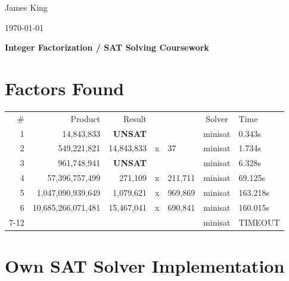 \documentclass[a4paper,12pt]{article}
\begin{document}
\begin{center}
\begin{minipage}{0.48\textwidth}
\begin{flushleft}
\small{James King}
\vspace{5mm}
\end{flushleft}
\end{minipage}
\begin{minipage}{0.48\textwidth}
\begin{flushright}
\small{\today}
\vspace{5mm}
\end{flushright}
\end{minipage}
\large{\textbf{Integer Factorization / \textsc{SAT} Solving Coursework}}
\end{center}

\section*{Factors Found}
\begin{tabular}{r r rcl c l}
\# & Product & Result & & & Solver & Time \\
1 & 14,843,833 & \textbf{UNSAT} & & & minisat & 0.343s \\
2 & 549,221,821 & 14,843,833 &x& 37 & minisat & 1.734s \\
3 & 961,748,941 & \textbf{UNSAT} & & & minisat & 6.328s \\
4 & 57,396,757,499 & 271,109 &x& 211,711 & minisat & 69.125s \\
5 & 1,047,090,939,649 & 1,079,621 &x& 969,869 & minisat & 163.218s \\
6 & 10,685,266,071,481 & 15,467,041 &x& 690,841 & minisat & 160.015s \\
7-12 & & & & & minisat & TIMEOUT \\
\end{tabular}

\section*{Own \textsc{SAT} Solver Implementation}
\end{document}
